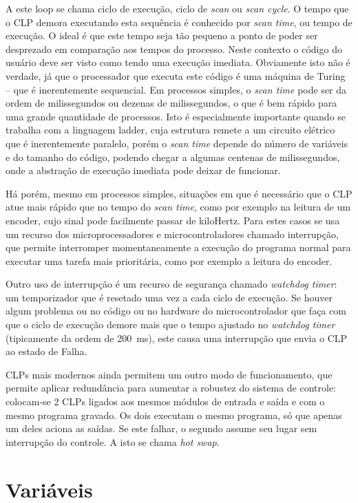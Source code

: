 A este loop se chama ciclo de execução, ciclo de \emph{scan} ou \emph{scan cycle}. O tempo que o CLP demora executando esta sequência é conhecido por \emph{scan time}, ou tempo de execução. O ideal é que este tempo seja tão pequeno a ponto de poder ser desprezado em comparação aos tempos do processo. Neste contexto o código do usuário deve ser visto como tendo uma execução imediata. Obviamente isto não é verdade, já que o processador que executa este código é uma máquina de Turing -- que é inerentemente sequencial. Em processos simples, o \emph{scan time} pode ser da ordem de milissegundos ou dezenas de milissegundos, o que é bem rápido para uma grande quantidade de processos. Isto é especialmente importante quando se trabalha com a linguagem ladder, cuja estrutura remete a um circuito elétrico que é inerentemente paralelo, porém o \emph{scan time} depende do número de variáveis e do tamanho do código, podendo chegar a algumas centenas de milissegundos, onde a abstração de execução imediata pode deixar de funcionar.

Há porém, mesmo em processos simples, situações em que é necessário que o CLP atue mais rápido que no tempo do \emph{scan time}, como por exemplo na leitura de um encoder, cujo sinal pode facilmente passar de kiloHertz. Para estes casos se usa um recurso dos microprocessadores e microcontroladores chamado interrupção, que permite interromper momentaneamente a execução do programa normal para executar uma tarefa mais prioritária, como por exemplo a leitura do encoder.

Outro uso de interrupção é um recurso de segurança chamado \emph{watchdog timer}: um temporizador que é resetado uma vez a cada ciclo de execução. Se houver algum problema ou no código ou no hardware do microcontrolador que faça com que o ciclo de execução demore mais que o tempo ajustado no \emph{watchdog timer} (tipicamente da ordem de \SI{200}{\milli\second}), este causa uma interrupção que envia o CLP ao estado de Falha.

CLPs mais modernos ainda permitem um outro modo de funcionamento, que permite aplicar redundância para aumentar a robustez do sistema de controle: colocam-se 2 CLPs ligados aos mesmos módulos de entrada e saída e com o mesmo programa gravado. Os dois executam o mesmo programa, só que apenas um deles aciona as saídas. Se este falhar, o segundo assume seu lugar sem interrupção do controle. A isto se chama \emph{hot swap}.

\section{Variáveis}

